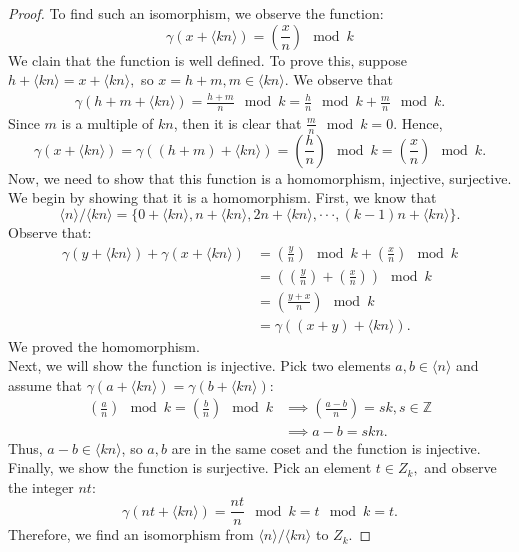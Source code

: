 \documentclass[a4paper,12pt]{article}
\begin{document}
\begin{proof}
    To find such an isomorphism, we observe the function:
    $$\gamma(x+\langle kn\rangle)=(\frac{x}{n}) \mod k$$
    We clain that the function is well defined. To prove this, suppose $h+\langle kn \rangle=x+\langle kn \rangle,$ so $x=h+m, m \in \langle kn \rangle.$ We observe that
    \begin{align*}
      \gamma(h+m+\langle kn \rangle) = \frac{h+m}{n} \mod k= \frac{h}{n} \mod k+ \frac{m}{n} \mod k.
    \end{align*}
    Since $m$ is a multiple of $kn$, then it is clear that $\frac{m}{n} \mod k=0.$
    Hence,
    \[\gamma(x+\langle kn \rangle)=  \gamma((h+m)+\langle kn \rangle)=(\frac{h}{n}) \mod k = (\frac{x}{n}) \mod k.\]
    Now, we need to show that this function is a homomorphism, injective, surjective. We begin by showing that it is a homomorphism.
    First, we know that $$\langle n \rangle/ \langle kn \rangle =\{0+\langle kn \rangle, n+\langle kn \rangle,2n+ \langle kn \rangle, \cdot \cdot \cdot , (k-1)n+ \langle kn \rangle \}.$$
    Observe that:
    \begin{align*}
      \gamma(y+\langle kn \rangle)+\gamma(x+\langle kn \rangle)&=(\frac{y}{n}) \mod k + (\frac{x}{n}) \mod k\\
      &=((\frac{y}{n})+(\frac{x}{n})) \mod k\\
      &=(\frac{y+x}{n}) \mod k\\
      &=\gamma((x+y)+\langle kn \rangle).
    \end{align*}
    We proved the homomorphism.\\
    Next, we will show the function is injective. Pick two elements $a,b \in \langle n \rangle$ and assume that $\gamma(a+\langle kn \rangle) =\gamma(b+\langle kn \rangle)$:
    \begin{align*}
      (\frac{a}{n})\mod k = (\frac{b}{n})\mod k &\implies (\frac{a-b}{n}) = sk, s \in \mathbb{Z}\\
                                                &\implies a-b=skn.
    \end{align*}
    Thus, $a-b \in \langle kn \rangle$, so $a,b$ are in the same coset and the function is injective.
    Finally, we show the function is surjective. Pick an element $t \in Z_k,$ and observe the integer $nt$:
    \[\gamma(nt+\langle kn \rangle)=\frac{nt}{n} \mod k= t \mod k =t.\]
    Therefore, we find an isomorphism from $\langle n \rangle / \langle kn \rangle$ to $Z_k.$
\end{proof}
\end{document}
